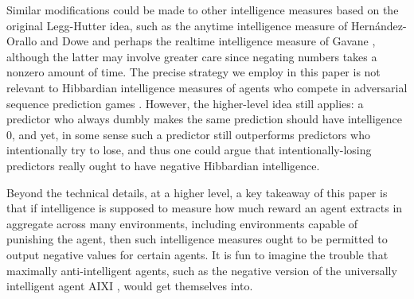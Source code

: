 \documentclass{article}
\begin{document}
Similar modifications could be made to other intelligence
measures based on the original Legg-Hutter idea, such as the anytime
intelligence measure of Hern{\'a}ndez-Orallo and Dowe \cite{hernandez}
and perhaps the realtime intelligence measure of Gavane \cite{gavane},
although the latter may involve greater care since negating numbers
takes a nonzero amount of time. The precise strategy we employ in this
paper is not relevant to Hibbardian intelligence measures of agents
who compete in adversarial sequence prediction games
\cite{hibbard} \cite{alexander2021measuring}. However, the higher-level
idea still applies: a predictor who always dumbly
makes the same prediction should have intelligence $0$, and yet, in some sense
such a predictor still outperforms predictors who intentionally try
to lose, and thus one could argue that intentionally-losing predictors
really ought to have negative Hibbardian intelligence.

Beyond the technical details, at a higher level, a key takeaway of
this paper is that if intelligence is supposed to measure how much
reward an agent extracts in aggregate across many environments,
including environments capable of punishing the agent, then such
intelligence measures ought to be permitted to output negative
values for certain agents. It is fun to imagine the trouble
that maximally anti-intelligent
agents, such as the negative version of the universally intelligent
agent AIXI \cite{hutter2004universal}, would get themselves into.




\end{document}
